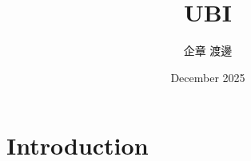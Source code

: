 \documentclass{article}
\title{UBI}
\author{企章 渡邊}
\date{December 2025}
\begin{document}
\maketitle

\section{Introduction}
\end{document}
